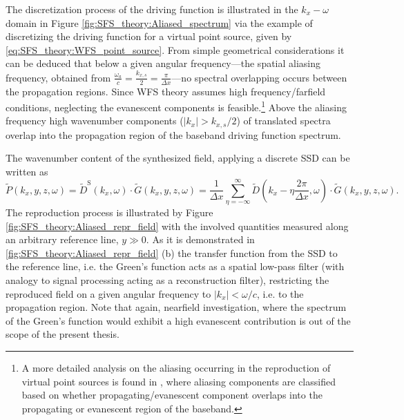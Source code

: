 The discretization process of the driving function is illustrated in the $k_x-\omega$ domain in Figure \ref{fig:SFS_theory:Aliased_spectrum} via the example of discretizing the driving function for a virtual point source, given by \eqref{eq:SFS_theory:WFS_point_source}.
From simple geometrical considerations it can be deduced that below a given angular frequency---the spatial aliasing frequency, obtained from $\frac{\omega_a }{c} = \frac{k_{x,s}}{2}= \frac{\pi}{\Delta x}$---no spectral overlapping occurs between the propagation regions.
Since WFS theory assumes high frequency/farfield conditions, neglecting the evanescent components is feasible.\footnote{A more detailed analysis on the aliasing occurring in the reproduction of virtual point sources is found in \cite{spors2009spatial}, where aliasing components are classified based on whether propagating/evanescent component overlaps into the propagating or evanescent region of the baseband.} 
Above the aliasing frequency high wavenumber components ($|k_x|>k_{x,s}/2$) of translated spectra overlap into the propagation region of the baseband driving function spectrum.

The wavenumber content of the synthesized field, applying a discrete SSD can be written as
\begin{equation}
\tilde{P}(k_x,y,z, \omega) = \tilde{D}^{\mathrm{S}}(k_x,\omega) \cdot \tilde{G}(k_x,y,z, \omega) = \frac{1}{\Delta x}
\sum_{\eta = -\infty}^{\infty} \tilde{D}\left(k_x - \eta \frac{2\pi}{\Delta x},\omega \right)  \cdot \tilde{G}(k_x,y,z, \omega).
\label{Eq:SFS_theory:Aliased_field_sp}
\end{equation}
The reproduction process is illustrated by Figure \ref{fig:SFS_theory:Aliased_repr_field} with the involved quantities measured along an arbitrary reference line, $y \gg 0$.
As it is demonstrated in \ref{fig:SFS_theory:Aliased_repr_field} (b) the transfer function from the SSD to the reference line, i.e. the Green's function acts as a spatial low-pass filter (with analogy to signal processing acting as a reconstruction filter), restricting the reproduced field on a given angular frequency to $|k_x| < \omega/c$, i.e. to the propagation region.
Note that again, nearfield investigation, where the spectrum of the Green's function would exhibit a high evanescent contribution is out of the scope of the present thesis.

